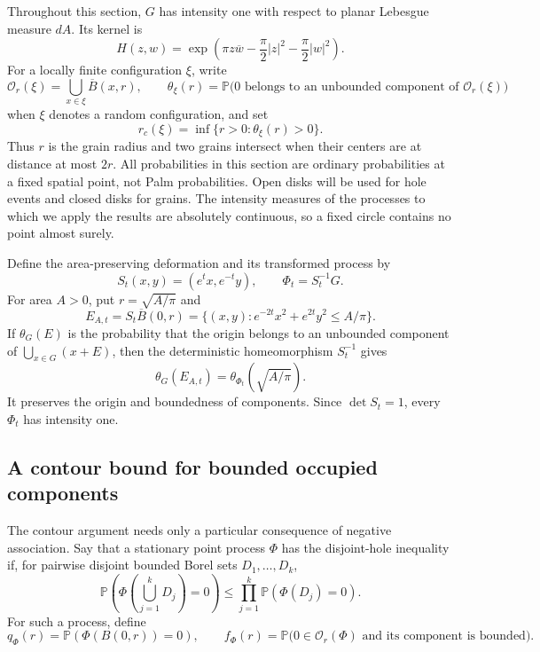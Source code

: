 \documentclass[11pt,a4paper]{article}
\theoremstyle{definition}
\theoremstyle{remark}
\numberwithin{equation}{section}
\begin{document}
Throughout this section, $G$ has intensity one with respect to planar
Lebesgue measure $dA$.  Its kernel is
\begin{equation}\label{ell:ginibre-kernel}
 H(z,w)=\exp\left(\pi z\overline w
       -\frac\pi2|z|^2-\frac\pi2|w|^2\right).
\end{equation}
For a locally finite configuration $\xi$, write
\[
 \mathcal O_r(\xi)=\bigcup_{x\in\xi}\overline B(x,r),
 \qquad
 \theta_\xi(r)=\mathbb P\bigl(0\text{ belongs to an unbounded
 component of }\mathcal O_r(\xi)\bigr)
\]
when $\xi$ denotes a random configuration, and set
\[
 r_c(\xi)=\inf\{r>0:\theta_\xi(r)>0\}.
\]
Thus $r$ is the grain radius and two grains intersect when their
centers are at distance at most $2r$.  All probabilities in this
section are ordinary probabilities at a fixed spatial point, not Palm
probabilities.  Open disks will be used for hole events and closed
disks for grains.  The intensity measures of the processes to which
we apply the results are absolutely continuous, so a fixed circle
contains no point almost surely.

Define the area-preserving deformation and its transformed process by
\begin{equation}\label{ell:deformation}
 S_t(x,y)=(e^t x,e^{-t}y),\qquad \Phi_t=S_t^{-1}G.
\end{equation}
For area $A>0$, put $r=\sqrt{A/\pi}$ and
\begin{equation}\label{ell:ellipse}
 E_{A,t}=S_t\overline B(0,r)
 =\{(x,y):e^{-2t}x^2+e^{2t}y^2\le A/\pi\}.
\end{equation}
If $\theta_G(E)$ is the probability that the origin belongs to an
unbounded component of $\bigcup_{x\in G}(x+E)$, then the deterministic
homeomorphism $S_t^{-1}$ gives
\begin{equation}\label{ell:affine-equivalence}
 \theta_G(E_{A,t})=\theta_{\Phi_t}(\sqrt{A/\pi}).
\end{equation}
It preserves the origin and boundedness of components.  Since
$\det S_t=1$, every $\Phi_t$ has intensity one.

\subsection{A contour bound for bounded occupied components}

The contour argument needs only a particular consequence of negative
association.  Say that a stationary point process $\Phi$ has the
disjoint-hole inequality if, for pairwise disjoint bounded Borel sets
$D_1,\ldots,D_k$,
\begin{equation}\label{ell:hole-na}
 \mathbb P\left(\Phi\left(\bigcup_{j=1}^kD_j\right)=0\right)
 \le\prod_{j=1}^k\mathbb P(\Phi(D_j)=0).
\end{equation}
For such a process, define
\[
 q_\Phi(r)=\mathbb P(\Phi(B(0,r))=0),\qquad
 f_\Phi(r)=\mathbb P\bigl(0\in\mathcal O_r(\Phi)
       \text{ and its component is bounded}\bigr).
\]
\end{document}

